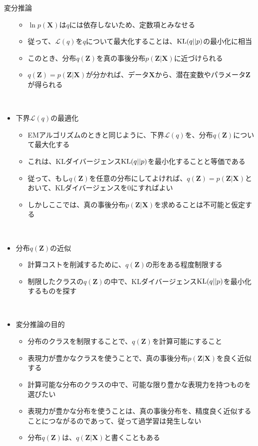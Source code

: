 \documentclass[dvipdfmx,notheorems,t]{beamer}
\begin{document}
\begin{frame}{変分推論}
\begin{itemize}
\begin{itemize}
		\item $\ln p(\bm{X})$は$q$には依存しないため、定数項とみなせる
		\item 従って、$\mathcal{L}(q)$を$q$について最大化することは、$\operatorname{KL} (q || p)$の最小化に相当
		\item このとき、分布$q(\bm{Z})$を真の事後分布$p(\bm{Z} | \bm{X})$に近づけられる
		\item $q(\bm{Z}) = p(\bm{Z} | \bm{X})$が分かれば、データ$\bm{X}$から、\color{red}潜在変数やパラメータ$\bm{Z}$が得られる\normalcolor
	\end{itemize} \
	
	\framebreak
	
	\item 下界$\mathcal{L}(q)$の最適化
	\begin{itemize}
		\item EMアルゴリズムのときと同じように、下界$\mathcal{L}(q)$を、分布$q(\bm{Z})$について最大化する
		\item これは、KLダイバージェンス$\operatorname{KL} (q || p)$を最小化することと等価である
		\newline
		\item 従って、\color{red}もし$q(\bm{Z})$を任意の分布にしてよければ\normalcolor 、$q(\bm{Z}) = p(\bm{Z} | \bm{X})$とおいて、KLダイバージェンスを$0$にすればよい
		\newline
		\item しかしここでは、\color{red}真の事後分布$p(\bm{Z} | \bm{X})$を求めることは不可能\normalcolor と仮定する
	\end{itemize} \
	
	\item 分布$q(\bm{Z})$の近似
	\begin{itemize}
		\item 計算コストを削減するために、$q(\bm{Z})$の形をある程度\alert{制限する}
		\item 制限したクラスの$q(\bm{Z})$の中で、KLダイバージェンス$\operatorname{KL} (q || p)$を最小化するものを探す
	\end{itemize} \
	
	\item 変分推論の目的
	\begin{itemize}
		\item 分布のクラスを制限することで、$q(\bm{Z})$を計算可能にすること
		\item 表現力が豊かなクラスを使うことで、真の事後分布$p(\bm{Z} | \bm{X})$を良く近似する
		\newline
		\item 計算可能な分布のクラスの中で、\alert{可能な限り豊かな表現力を持つ}ものを選びたい
		\item 表現力が豊かな分布を使うことは、真の事後分布を、精度良く近似することにつながるのであって、従って\alert{過学習は発生しない}
		\newline
		\item 分布$q(\bm{Z})$は、$q(\bm{Z} | \bm{X})$と書くこともある
	\end{itemize}
\end{itemize}

\end{frame}
\end{document}
